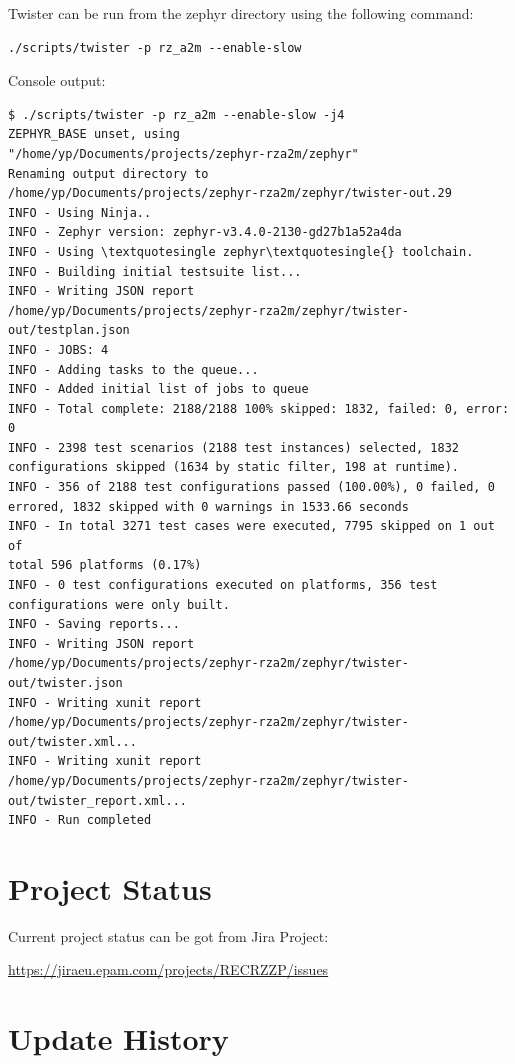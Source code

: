\documentclass[11pt,a4paper,oneside]{article}
\begin{document}
Twister can be run from the zephyr directory using the following
command:

\begin{lstlisting}
./scripts/twister -p rz_a2m --enable-slow
\end{lstlisting}

Console output:

\begin{lstlisting}
$ ./scripts/twister -p rz_a2m --enable-slow -j4
ZEPHYR_BASE unset, using
"/home/yp/Documents/projects/zephyr-rza2m/zephyr"
Renaming output directory to
/home/yp/Documents/projects/zephyr-rza2m/zephyr/twister-out.29
INFO - Using Ninja..
INFO - Zephyr version: zephyr-v3.4.0-2130-gd27b1a52a4da
INFO - Using \textquotesingle zephyr\textquotesingle{} toolchain.
INFO - Building initial testsuite list...
INFO - Writing JSON report
/home/yp/Documents/projects/zephyr-rza2m/zephyr/twister-out/testplan.json
INFO - JOBS: 4
INFO - Adding tasks to the queue...
INFO - Added initial list of jobs to queue
INFO - Total complete: 2188/2188 100% skipped: 1832, failed: 0, error:
0
INFO - 2398 test scenarios (2188 test instances) selected, 1832
configurations skipped (1634 by static filter, 198 at runtime).
INFO - 356 of 2188 test configurations passed (100.00%), 0 failed, 0
errored, 1832 skipped with 0 warnings in 1533.66 seconds
INFO - In total 3271 test cases were executed, 7795 skipped on 1 out of
total 596 platforms (0.17%)
INFO - 0 test configurations executed on platforms, 356 test
configurations were only built.
INFO - Saving reports...
INFO - Writing JSON report
/home/yp/Documents/projects/zephyr-rza2m/zephyr/twister-out/twister.json
INFO - Writing xunit report
/home/yp/Documents/projects/zephyr-rza2m/zephyr/twister-out/twister.xml...
INFO - Writing xunit report
/home/yp/Documents/projects/zephyr-rza2m/zephyr/twister-out/twister_report.xml...
INFO - Run completed
\end{lstlisting}

\section{Project Status}\label{project-status}

Current project status can be got from Jira Project:

\url{https://jiraeu.epam.com/projects/RECRZZP/issues}

\section{Update History}\label{update-history}
\end{document}
